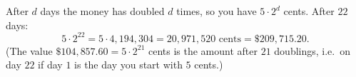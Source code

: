 After $d$ days the money has doubled $d$ times, so you have $5\cdot2^d$ cents. After $22$ days:
\[
5\cdot2^{22}=5\cdot4{,}194{,}304=20{,}971{,}520\text{ cents}=\boxed{\$209{,}715.20}.
\]
(The value $\$104{,}857.60=5\cdot2^{21}$ cents is the amount after $21$ doublings, i.e.\ on day $22$ if day $1$ is the day you start with $5$ cents.)
